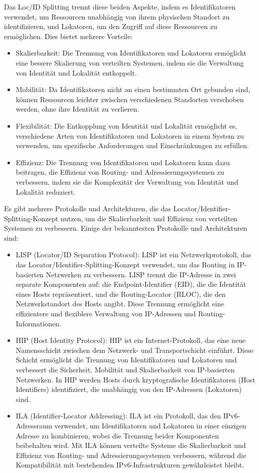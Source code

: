Das Loc/ID Splitting trennt diese beiden Aspekte, indem es Identifikatoren verwendet, um Ressourcen unabhängig von ihrem physischen Standort zu identifizieren, und Lokatoren, um den Zugriff auf diese Ressourcen zu ermöglichen. Dies bietet mehrere Vorteile:
\begin{itemize}
\item Skalierbarkeit: Die Trennung von Identifikatoren und Lokatoren ermöglicht eine bessere Skalierung von verteilten Systemen, indem sie die Verwaltung von Identität und Lokalität entkoppelt.
\item Mobilität: Da Identifikatoren nicht an einen bestimmten Ort gebunden sind, können Ressourcen leichter zwischen verschiedenen Standorten verschoben werden, ohne ihre Identität zu verlieren.
\item Flexibilität: Die Entkopplung von Identität und Lokalität ermöglicht es, verschiedene Arten von Identifikatoren und Lokatoren in einem System zu verwenden, um spezifische Anforderungen und Einschränkungen zu erfüllen.
\item Effizienz: Die Trennung von Identifikatoren und Lokatoren kann dazu beitragen, die Effizienz von Routing- und Adressierungssystemen zu verbessern, indem sie die Komplexität der Verwaltung von Identität und Lokalität reduziert.
\end{itemize}

Es gibt mehrere Protokolle und Architekturen, die das Locator/Identifier-Splitting-Konzept nutzen, um die Skalierbarkeit und Effizienz von verteilten Systemen zu verbessern. Einige der bekanntesten Protokolle und Architekturen sind:
\begin{itemize}
\item LISP (Locator/ID Separation Protocol): LISP ist ein Netzwerkprotokoll, das das Locator/Identifier-Splitting-Konzept verwendet, um das Routing in IP-basierten Netzwerken zu verbessern. LISP trennt die IP-Adresse in zwei separate Komponenten auf: die Endpoint-Identifier (EID), die die Identität eines Hosts repräsentiert, und die Routing-Locator (RLOC), die den Netzwerkstandort des Hosts angibt. Diese Trennung ermöglicht eine effizientere und flexiblere Verwaltung von IP-Adressen und Routing-Informationen.
\item HIP (Host Identity Protocol): HIP ist ein Internet-Protokoll, das eine neue Namensschicht zwischen dem Netzwerk- und Transportschicht einführt. Diese Schicht ermöglicht die Trennung von Identifikatoren und Lokatoren und verbessert die Sicherheit, Mobilität und Skalierbarkeit von IP-basierten Netzwerken. In HIP werden Hosts durch kryptografische Identifikatoren (Host Identifiers) identifiziert, die unabhängig von den IP-Adressen (Lokatoren) sind.
\item ILA (Identifier-Locator Addressing): ILA ist ein Protokoll, das den IPv6-Adressraum verwendet, um Identifikatoren und Lokatoren in einer einzigen Adresse zu kombinieren, wobei die Trennung beider Komponenten beibehalten wird. Mit ILA können verteilte Systeme die Skalierbarkeit und Effizienz von Routing- und Adressierungssystemen verbessern, während die Kompatibilität mit bestehenden IPv6-Infrastrukturen gewährleistet bleibt.
\end{itemize} 

